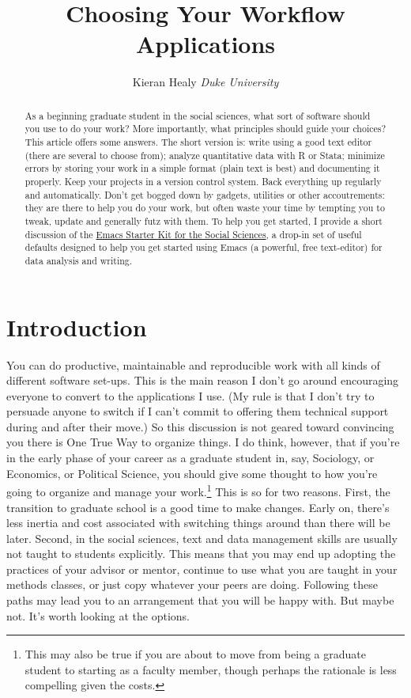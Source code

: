\documentclass[11pt,article,oneside]{memoir}
\title{Choosing Your Workflow Applications}
\author{Kieran Healy \newline \emph{Duke University}}
\date{}
\begin{document}
\maketitle


\thispagestyle{kjhgit}

\begin{abstract}
  As a beginning graduate student in the social sciences, what sort of
  software should you use to do your work? More importantly, what
  principles should guide your choices? This article offers some
  answers. The short version is: write using a good text editor (there
  are several to choose from); analyze quantitative data with R or
  Stata; minimize errors by storing your work in a simple format
  (plain text is best) and documenting it properly. Keep your projects
  in a version control system. Back everything up regularly and
  automatically. Don't get bogged down by gadgets, utilities or other
  accoutrements: they are there to help you do your work, but often
  waste your time by tempting you to tweak, update and generally futz
  with them. To help you get started, I provide a short discussion of
  the \href{http://kjhealy.github.com/emacs-starter-kit/}{Emacs
    Starter Kit for the Social Sciences}, a drop-in set of useful
  defaults designed to help you get started using Emacs (a powerful,
  free text-editor) for data analysis and writing.
\end{abstract}

\section*{Introduction}
\label{sec-1}

You can do productive, maintainable and reproducible work with all
kinds of different software set-ups. This is the main reason I don't go around encouraging
everyone to convert to the applications I use. (My rule is that I
don't try to persuade anyone to switch if I can't commit to offering
them technical support during and after their move.) So this
discussion is not geared toward convincing you there is One True Way
to organize things. I do think, however, that if you're in the early
phase of your career as a graduate student in, say, Sociology, or
Economics, or Political Science, you should give some thought to how
you're going to organize and manage your work.\footnote{This may also
  be true if you are about to move from being a graduate student to
  starting as a faculty member, though perhaps the rationale is less
  compelling given the costs. } This is so for two reasons. First, the
transition to graduate school is a good time to make changes. Early
on, there's less inertia and cost associated with switching things
around than there will be later. Second, in the social sciences, text
and data management skills are usually not taught to students
explicitly. This means that you may end up adopting the practices of
your advisor or mentor, continue to use what you are taught in your
methods classes, or just copy whatever your peers are doing. Following
these paths may lead you to an arrangement that you will be happy
with. But maybe not. It's worth looking at the options.
\end{document}
